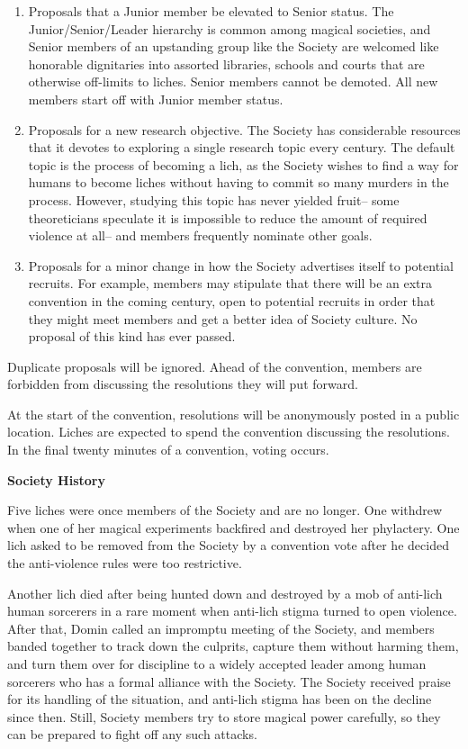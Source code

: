\documentclass[blue]{Sel}
\begin{document}
\begin{enumerate}
\item Proposals that a Junior member be elevated to Senior status. The Junior/Senior/Leader hierarchy is common among magical societies, and Senior members of an upstanding group like the Society are welcomed like honorable dignitaries into assorted libraries, schools and courts that are otherwise off-limits to liches. Senior members cannot be demoted. All new members start off with Junior member status.
\item Proposals for a new research objective. The Society has considerable resources that it devotes to exploring a single research topic every century. The default topic is the process of becoming a lich, as the Society wishes to find a way for humans to become liches without having to commit so many murders in the process. However, studying this topic has never yielded fruit-- some theoreticians speculate it is impossible to reduce the amount of required violence at all-- and members frequently nominate other goals.
\item Proposals for a minor change in how the Society advertises itself to potential recruits. For example, members may stipulate that there will be an extra convention in the coming century, open to potential recruits in order that they might meet members and get a better idea of Society culture. No proposal of this kind has ever passed.
\end{enumerate}

Duplicate proposals will be ignored. Ahead of the convention, members are forbidden from discussing the resolutions they will put forward.

At the start of the convention, resolutions will be anonymously posted in a public location. Liches are expected to spend the convention discussing the resolutions. In the final twenty minutes of a convention, voting occurs.

\textbf{Society History}

Five liches were once members of the Society and are no longer. One withdrew when one of her magical experiments backfired and destroyed her phylactery. One lich asked to be removed from the Society by a convention vote after he decided the anti-violence rules were too restrictive. 

Another lich died after being hunted down and destroyed by a mob of anti-lich human sorcerers in a rare moment when anti-lich stigma turned to open violence. After that, Domin called an impromptu meeting of the Society, and members banded together to track down the culprits, capture them without harming them, and turn them over for discipline to a widely accepted leader among human sorcerers who has a formal alliance with the Society. The Society received praise for its handling of the situation, and anti-lich stigma has been on the decline since then. Still, Society members try to store magical power carefully, so they can be prepared to fight off any such attacks.
\end{document}
